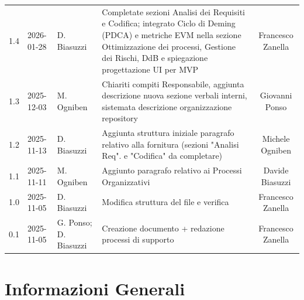 \documentclass[a4paper, 11pt, oneside]{scrartcl}
\begin{document}
\begin{center}
{\begin{tabular}{@{}llp{}p{}c@{}}
            1.4               & 2026-01-28    & D. Biasuzzi           & Completate sezioni Analisi dei Requisiti e Codifica; integrato Ciclo di Deming (PDCA) e metriche EVM nella sezione Ottimizzazione dei processi, Gestione dei Rischi, DdB e spiegazione progettazione UI per MVP & Francesco Zanella       \\
            1.3               & 2025-12-03    & M. Ogniben            & Chiariti compiti Responsabile, aggiunta descrizione nuova sezione verbali interni, sistemata descrizione organizzazione repository                                                                              & Giovanni Ponso          \\
            1.2               & 2025-11-13    & D. Biasuzzi           & Aggiunta struttura iniziale paragrafo relativo alla fornitura (sezioni "Analisi Req". e "Codifica" da completare)                                                                                               & Michele Ogniben         \\
            1.1               & 2025-11-11    & M. Ogniben            & Aggiunto paragrafo relativo ai Processi Organizzativi                                                                                                                                                           & Davide Biasuzzi         \\
            1.0               & 2025-11-05    & D. Biasuzzi           & Modifica struttura del file e verifica                                                                                                                                                                          & Francesco Zanella       \\
            0.1               & 2025-11-05    & G. Ponso; D. Biasuzzi & Creazione documento + redazione processi di supporto                                                                                                                                                            & Francesco Zanella       \\
            \bottomrule
        \end{tabular}
    }
\end{center}

\newpage
\tableofcontents
\pagestyle{fancy}

\newpage
\section{Informazioni Generali}
\end{document}
